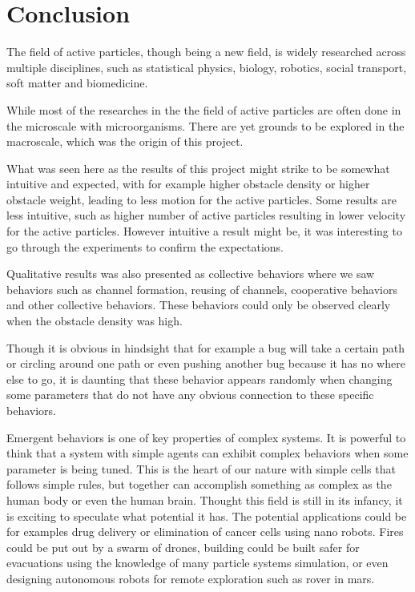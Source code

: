 \chapter{Conclusion}
The field of active particles, though being a new field, is widely researched across
multiple disciplines, such as statistical physics\cite{ramaswamy2010mechanics}, 
biology\cite{viswanathan2011physics}, robotics\cite{brambilla2013swarm}, social transport\cite{helbing2001traffic}, soft matter\cite{marchetti2013hydrodynamics} and biomedicine\cite{wang2012nano}. 

While most of the researches in the the field of active particles are often done in 
the microscale with microorganisms\cite{lauga2009hydrodynamics, cates2012diffusive, poon2013clarkia}.
There are yet grounds to be explored in the macroscale, which was the origin of this project.

What was seen here as the results of this project might strike to be somewhat intuitive 
and expected, with for example higher obstacle density or higher obstacle weight, 
leading to less motion for the active particles. Some results are less intuitive, 
such as higher number of active particles resulting in lower velocity for the active particles. 
However intuitive a result might be, it was interesting to go through the experiments to confirm 
the expectations.

Qualitative results was also presented as collective behaviors where we saw 
behaviors such as channel formation, reusing of channels, cooperative behaviors 
and other collective behaviors. These behaviors could only be observed clearly 
when the obstacle density was high.

Though it is obvious in hindsight that for example a bug will take a certain path 
or circling around one path or even pushing another bug because it has no where else 
to go, it is daunting that these behavior appears randomly when changing some parameters 
that do not have any obvious connection to these specific behaviors.        

Emergent behaviors is one of key properties of complex systems. 
It is powerful to think that a system with simple agents can exhibit complex behaviors when 
some parameter is being tuned. This is the heart of our nature with simple cells that follows 
simple rules, but together can accomplish something as complex as the human body\cite{hmelo2006understanding} or even 
the human brain\cite{meunier2009hierarchical}. Thought this field is still in its infancy, 
it is exciting to speculate what potential it has. The potential applications could be 
for examples drug delivery or elimination of cancer cells using nano robots. 
Fires could be put out by a swarm of drones, building could be built safer for evacuations using the knowledge of 
many particle systems simulation, or even designing autonomous robots for remote exploration such as rover in mars. 

